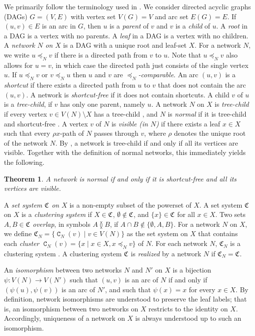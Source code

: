 \documentclass[preprint]{elsarticle}
\newtheorem{theorem}{Theorem}
\newcommand{\CS}[1][]{\ensuremath{\mathfrak{C}_{#1}}}
\DeclareMathOperator{\CC}{\mathtt{C}}
\newcommand{\overlaps}{\between}
\begin{document}
We primarily follow the terminology used in \cite{Hellmuth:2023}.
We consider directed acyclic graphs (DAGs) $G=(V,E)$ with vertex set $V(G)=V$ and arc set $E(G)=E$.
If $(u,v)\in E$ is an arc in $G$, then $u$ is a \emph{parent} of $v$ and $v$ is a \emph{child} of
$u$. A \emph{root} in a DAG is a vertex with no parents. A \emph{leaf} in a DAG is a vertex with no
children. A \emph{network $N$ on $X$} is a DAG with a unique root and leaf-set $X$. For a network
$N$, we write $u\preceq_N v$ if there is a directed path from $v$ to $u$. Note that $u\preceq_N v$
also allows for $u=v$, in which case the directed path just consists of the single vertex $u$. If
$u\preceq_N v$ or $v\preceq_N u$ then $u$ and $v$ are \emph{$\preceq_N$-comparable}. An arc
$(u,v)$ is a \emph{shortcut} if there exists a directed path from $u$ to $v$ that does not contain
the arc $(u,v)$. A network is \emph{shortcut-free} if it does not contain shortcuts. A child
$v$ of $u$ is a \emph{tree-child}, if $v$ has only one parent, namely $u$. A network $N$ on $X$ is
\emph{tree-child} if every vertex $v \in V(N) \setminus X$ has a tree-child \cite{Cardona:2009}, and
$N$ is \emph{normal} if it is tree-child and shortcut-free \cite{Willson:2010}. A vertex $v$ of $N$
is \emph{visible (in $N$)} if there exists a leaf $x\in X$ such that every $\rho x$-path of $N$
passes through $v$, where $\rho$ denotes the unique root of the network $N$. 
By \cite[Lem.~2]{Cardona:2009}, a network is tree-child if and only if all its vertices are visible.
Together with the definition of normal networks, this immediately yields the following.
\begin{theorem}\label{thm:char-normal-vis}
A network is normal if and only if it is shortcut-free and all its vertices are visible.
\end{theorem} 

A \emph{set system $\CS$ on $X$} is a non-empty subset of the powerset of $X$. A set system $\CS$ on
$X$ is a \emph{clustering system} if $X\in \CS$, $\emptyset\notin\CS$, and $\{x\}\in \CS$ for all $x\in
X$. Two sets $A,B\in \CS$ \emph{overlap}, in symbols $A\overlaps B$, if $A\cap B \notin \{\emptyset,
A,B\}$. For a network $N$ on $X$, we define  $\CS[N]=\{\CC_N(v)\mid v\in V(N)\}$
as the set system on $X$ that
contains each \emph{cluster} $\CC_N(v) = \{ x \mid x\in X, x\preceq_N v \}$ of $N$. 
For each network $N$, $\CS[N]$ is a clustering system \cite[Lem~14]{Hellmuth:2023}. A clustering system $\CS$ is \emph{realized}
by a network $N$ if $\CS[N]=\CS$.

An \emph{isomorphism} between two networks $N$ and $N'$ on $X$ is a bijection
$\psi\colon V(N)\to V(N')$ such that $(u,v)$ is an arc of $N$ if and only if 
$(\psi(u),\psi(v))$ is an arc of $N'$, and such that $\psi(x)=x$ for every $x\in X$. 
By definition, network isomorphisms are understood to preserve the leaf labels; that is, an isomorphism
between two networks on $X$ restricts to the identity on $X$. Accordingly, uniqueness of a network
on $X$ is always understood up to such an isomorphism.
\end{document}

